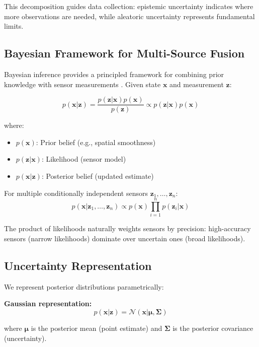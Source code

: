 \documentclass[11pt,letterpaper]{article}
\newcommand{\bx}{\mathbf{x}}
\newcommand{\bz}{\mathbf{z}}
\newcommand{\bmu}{\boldsymbol{\mu}}
\newcommand{\bSigma}{\boldsymbol{\Sigma}}
\newcommand{\Normal}{\mathcal{N}}
\begin{document}
This decomposition guides data collection: epistemic uncertainty indicates where more observations are needed, while aleatoric uncertainty represents fundamental limits.

\subsection{Bayesian Framework for Multi-Source Fusion}

Bayesian inference provides a principled framework for combining prior knowledge with sensor measurements \citep{rasmussen2006gaussian}. Given state $\bx$ and measurement $\bz$:

\begin{equation}
p(\bx | \bz) = \frac{p(\bz | \bx) p(\bx)}{p(\bz)} \propto p(\bz | \bx) p(\bx)
\label{eq:bayes}
\end{equation}

where:
\begin{itemize}
    \item $p(\bx)$: Prior belief (e.g., spatial smoothness)
    \item $p(\bz | \bx)$: Likelihood (sensor model)
    \item $p(\bx | \bz)$: Posterior belief (updated estimate)
\end{itemize}

For multiple conditionally independent sensors $\bz_1, \ldots, \bz_n$:
\begin{equation}
p(\bx | \bz_1, \ldots, \bz_n) \propto p(\bx) \prod_{i=1}^{n} p(\bz_i | \bx)
\label{eq:multi_sensor}
\end{equation}

The product of likelihoods naturally weights sensors by precision: high-accuracy sensors (narrow likelihoods) dominate over uncertain ones (broad likelihoods).

\subsection{Uncertainty Representation}

We represent posterior distributions parametrically:

\textbf{Gaussian representation:}
\begin{equation}
p(\bx | \bz) = \Normal(\bx | \bmu, \bSigma)
\end{equation}

where $\bmu$ is the posterior mean (point estimate) and $\bSigma$ is the posterior covariance (uncertainty).
\end{document}
